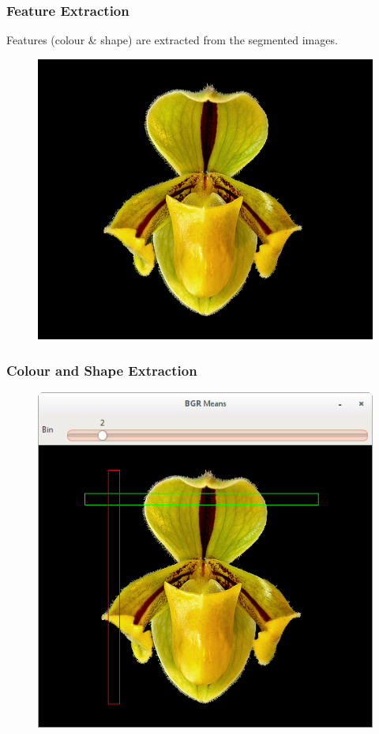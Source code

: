 \documentclass[]{beamer}
\begin{document}
    \begin{frame}
        \frametitle{Feature Extraction}

        Features (colour \& shape) are extracted from the segmented images.

        \vspace{10 mm}

        \begin{figure}[!htb]
              \includegraphics[width=\linewidth]{grabcut_output}
            \endminipage\hfill
        \end{figure}
    \end{frame}

    \begin{frame}[plain]
        \frametitle{Colour and Shape Extraction}

        \begin{figure}[h]
        \centering
        \includegraphics[width=.60\textwidth]{BGR_means_bins}
        \end{figure}
    \end{frame}
\end{document}
